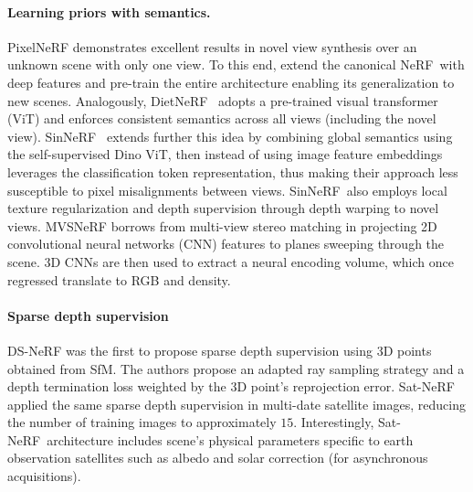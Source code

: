 \documentclass{isprs} %
\newcommand{\Nerf}{{NeRF}}
\begin{document}
\paragraph{Learning priors with semantics.}
{PixelNeRF} demonstrates excellent results in novel view synthesis over an unknown scene with only one view. To this end, \cite{yu2021pixelnerf}  extend the canonical \Nerf~with deep features and pre-train the entire architecture enabling its generalization to new scenes. Analogously, Diet\Nerf~\cite{jain2021putting} adopts a pre-trained visual transformer (ViT) and enforces consistent semantics across all views (including the novel view). Sin\Nerf~\cite{xu2022sinnerf} extends further this idea by combining global semantics using the self-supervised Dino ViT, then instead of using image feature embeddings leverages the classification token representation, thus making their approach less susceptible to pixel misalignments between views. Sin\Nerf~also employs local texture regularization and depth supervision through depth warping to novel views. {MVSNeRF}  \cite{chen2021mvsnerf} borrows from multi-view stereo matching in projecting 2D convolutional neural networks (CNN) features to planes sweeping through the scene. 3D CNNs are then used to extract a neural encoding volume, which once regressed translate to RGB and density. 
%

\paragraph{Sparse depth supervision} DS-NeRF \cite{deng2022depth} was the first to propose sparse depth supervision using 3D points obtained from SfM. The authors propose an adapted ray sampling strategy and a depth termination loss weighted by the 3D point's reprojection error.  Sat-NeRF \cite{mari2022sat} applied the same sparse depth supervision in multi-date satellite images, reducing the number of training images to approximately $15$. Interestingly, Sat-\Nerf~architecture includes scene's physical parameters specific to earth observation satellites such as albedo and solar correction (for asynchronous acquisitions).
\end{document}

